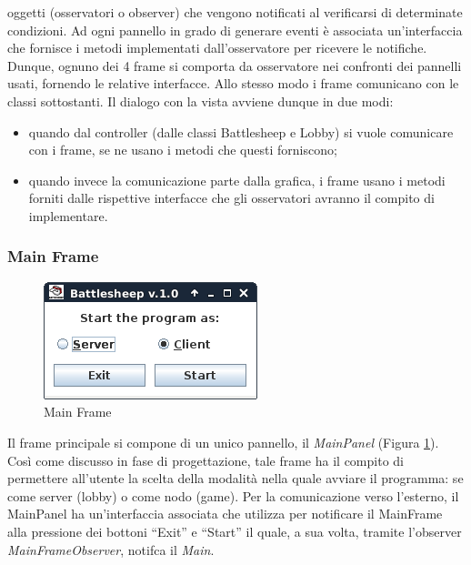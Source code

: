 oggetti (osservatori o observer) che vengono notificati
al verificarsi di determinate condizioni. Ad ogni pannello in grado di
generare eventi è associata un'interfaccia che fornisce i metodi implementati dall'osservatore per ricevere le notifiche.
Dunque, ognuno dei 4 frame si comporta da osservatore nei confronti dei pannelli usati, fornendo
le relative interfacce. Allo stesso modo i frame comunicano con le classi
sottostanti. Il dialogo con la vista avviene dunque in due modi:
\begin{itemize}
	\item quando dal controller (dalle classi Battlesheep e Lobby) si vuole comunicare con i frame, se ne usano i
	metodi che questi forniscono;
	\item quando invece la comunicazione parte dalla grafica, i frame usano i
	metodi forniti dalle rispettive interfacce che gli osservatori avranno il
	compito di implementare.
\end{itemize}



\subsubsection{Main Frame}
\begin{figure}[!h]
	\centering
	\includegraphics[scale=0.4]{core/imgs/gui/main_frame}
	\caption{Main Frame}
	\label{figure:main_frame}
\end{figure}
Il frame principale si compone di un unico pannello, il \textit{MainPanel} (Figura \ref{figure:main_frame}).
Così come discusso in fase di progettazione, tale frame ha il compito di
permettere all'utente la scelta della modalità nella quale avviare il programma:
se come server (lobby) o come nodo (game).\newline
Per la comunicazione verso l'esterno, il MainPanel ha un'interfaccia associata
che utilizza per notificare il MainFrame alla pressione dei bottoni ``Exit'' e
``Start'' il quale, a sua volta, tramite l'observer \textit{MainFrameObserver},
notifca il \textit{Main}.



